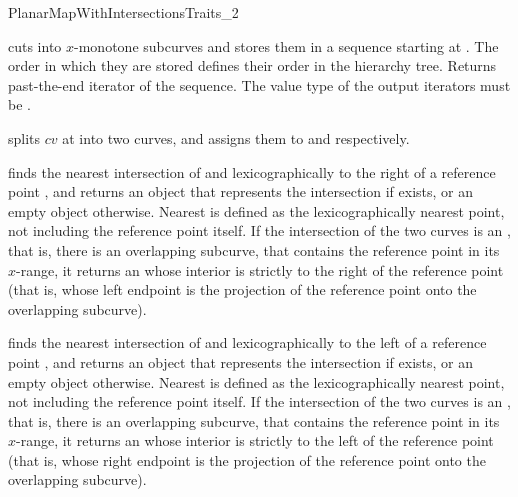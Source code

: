 \begin{ccRefConcept}{PlanarMapWithIntersectionsTraits_2}

	 {cuts  into $x$-monotone subcurves and stores them in a
	  sequence starting at . The order in which they are stored
	  defines their order in the hierarchy tree. Returns past-the-end
	  iterator of the sequence. The value type of the output iterators
          must be .}

         {splits $cv$ at  into two curves, and assigns them to
            and  respectively.
           }

	 {finds the nearest intersection of  and
	   lexicographically to the right of a reference point
	  , and returns an object that represents the intersection if
	  exists, or an empty object otherwise.
          Nearest is defined as the lexicographically nearest point, not
	  including the reference point itself. If the intersection of the
	  two curves is an , that is, there is an
	  overlapping subcurve, that contains the reference point in its
	  $x$-range, it returns an  whose interior is
	  strictly to the right of the reference point (that is, whose
	  left endpoint is the projection of the reference point onto the 
	  overlapping subcurve).}

	 {finds the nearest intersection of  and
	   lexicographically to the left of a reference point
	  , and returns an object that represents the intersection if
	  exists, or an empty object otherwise.
          Nearest is defined as the lexicographically nearest point, not
	  including the reference point itself. If the intersection of the
	  two curves is an , that is, there is an
	  overlapping subcurve, that contains the reference point in its
	  $x$-range, it returns an  whose interior is
	  strictly to the left of the reference point (that is, whose
	  right endpoint is the projection of the reference point onto the 
	  overlapping subcurve).}


\end{ccRefConcept}
